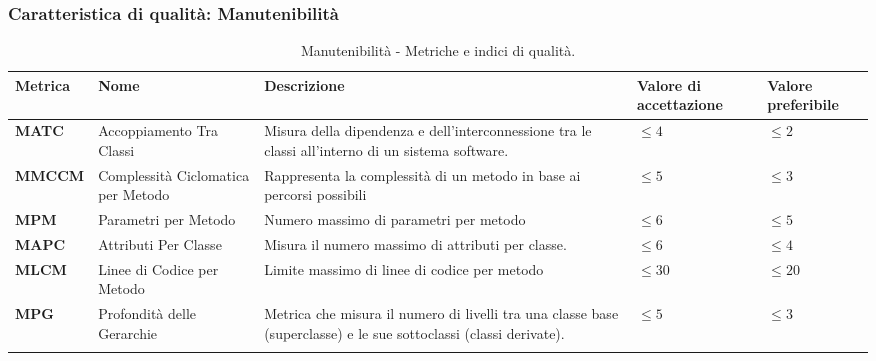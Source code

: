 \subsubsection{Caratteristica di qualità: Manutenibilità}
\hspace{1pt}
    \begin{longtable}{|C{1.8cm}|L{3cm}|L{4cm}|L{2.5cm}|L{2.5cm}|}
                \hline
                \textbf{Metrica} & \textbf{Nome} & \textbf{Descrizione} & \textbf{Valore di accettazione} & \textbf{Valore preferibile}\\
                \hline
                \textbf{MATC} & Accoppiamento Tra Classi & Misura della dipendenza e dell'interconnessione tra le classi all'interno di un sistema software.   & $\leq 4$  & $\leq 2$ \\
                \hline
                \textbf{MMCCM} & Complessità Ciclomatica per Metodo & Rappresenta la complessità di un metodo in base ai percorsi possibili & $\leq 5$ & $\leq 3$ \\
                \hline
                \textbf{MPM} & Parametri per Metodo & Numero massimo di parametri per metodo & $\leq 6$ & $\leq 5$ \\
                \hline
                \textbf{MAPC} & Attributi Per Classe & Misura il numero massimo di attributi per classe. & $\leq 6$ & $\leq 4$ \\
                \hline
                 \textbf{MLCM} & Linee di Codice per Metodo & Limite massimo di linee di codice per metodo & $\leq 30$ & $\leq 20$ \\
                \hline
                \textbf{MPG} & Profondità delle Gerarchie & Metrica che misura il numero di livelli tra una classe base (superclasse) e le sue sottoclassi (classi derivate). & $\leq 5$  & $\leq 3$ \\
                \hline
                \caption{Manutenibilità - Metriche e indici di qualità.}
        \label{tab:metriche_manutenibilità_testo}
    \end{longtable}


